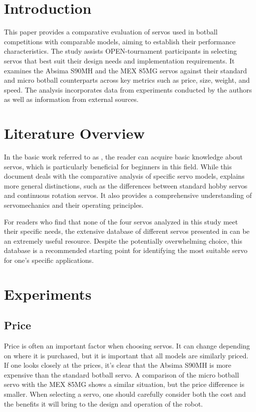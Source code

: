 \documentclass[conference]{IEEEtran}
\begin{document}
\section{Introduction}
This paper provides a comparative evaluation of servos used in botball competitions with comparable models, aiming to establish their performance characteristics. The study assists OPEN-tournament participants in selecting servos that best suit their design needs and implementation requirements. It examines the Absima S90MH and the MEX 85MG servos against their standard and micro botball counterparts across key metrics such as price, size, weight, and speed. The analysis incorporates data from experiments conducted by the authors as well as information from external sources.

\section {Literature Overview}

In the basic work referred to as \cite{b1}, the reader can acquire basic knowledge about servos, which is particularly beneficial for beginners in this field. While this document deals with the comparative analysis of specific servo models, \cite{b1} explains more general distinctions, such as the differences between standard hobby servos and continuous rotation servos. It also provides a comprehensive understanding of servomechanics and their operating principles.

For readers who find that none of the four servos analyzed in this study meet their specific needs, the extensive database of different servos presented in \cite{b2} can be an extremely useful resource. Despite the potentially overwhelming choice, this database is a recommended starting point for identifying the most suitable servo for one's specific applications.

\section{Experiments}
\subsection{Price}
Price is often an important factor when choosing servos. It can change depending on where it is purchased, but it is important that all models are similarly priced. If one looks closely at the prices, it's clear that the Absima S90MH is more expensive than the standard botball servo. A comparison of the micro botball servo with the MEX 85MG shows a similar situation, but the price difference is smaller. When selecting a servo, one should carefully consider both the cost and the benefits it will bring to the design and operation of the robot.
\end{document}
